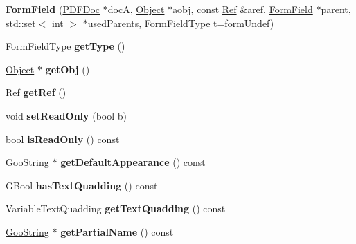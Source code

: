 \begin{DoxyCompactItemize}
\item 
\mbox{\label{class_form_field_a4388afec6d6bf05640197e3330332d1b}} 
{\bfseries Form\+Field} (\hyperlink{class_p_d_f_doc}{P\+D\+F\+Doc} $\ast$docA, \hyperlink{class_object}{Object} $\ast$aobj, const \hyperlink{struct_ref}{Ref} \&aref, \hyperlink{class_form_field}{Form\+Field} $\ast$parent, std\+::set$<$ int $>$ $\ast$used\+Parents, Form\+Field\+Type t=form\+Undef)
\item 
\mbox{\label{class_form_field_aa9d913c53cd71d414ca6faa0627de9c7}} 
Form\+Field\+Type {\bfseries get\+Type} ()
\item 
\mbox{\label{class_form_field_a93d191feb396ef0de7e744134549f473}} 
\hyperlink{class_object}{Object} $\ast$ {\bfseries get\+Obj} ()
\item 
\mbox{\label{class_form_field_a2c1ba58037d8566d7e3097a80d1d22f4}} 
\hyperlink{struct_ref}{Ref} {\bfseries get\+Ref} ()
\item 
\mbox{\label{class_form_field_a0142a987615fa39ce95eda8b87b7dd86}} 
void {\bfseries set\+Read\+Only} (bool b)
\item 
\mbox{\label{class_form_field_a03fcab88eb5e93cec0b64c086219b8de}} 
bool {\bfseries is\+Read\+Only} () const
\item 
\mbox{\label{class_form_field_a322b72a9817ec8b520cbdac324e7b89f}} 
\hyperlink{class_goo_string}{Goo\+String} $\ast$ {\bfseries get\+Default\+Appearance} () const
\item 
\mbox{\label{class_form_field_a63d98c48a23e5d5e883a4edefe5b44bd}} 
G\+Bool {\bfseries has\+Text\+Quadding} () const
\item 
\mbox{\label{class_form_field_aa17618ad6fc948d20b05c4ca7d9fe4a8}} 
Variable\+Text\+Quadding {\bfseries get\+Text\+Quadding} () const
\item 
\mbox{\label{class_form_field_a70769f62fde0cc2a624d552d5879e7b3}} 
\hyperlink{class_goo_string}{Goo\+String} $\ast$ {\bfseries get\+Partial\+Name} () const

\end{DoxyCompactItemize}
